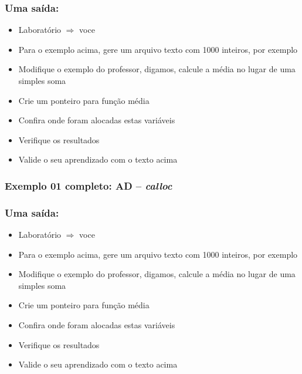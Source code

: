 \begin{frame}[fragile, c]

\frametitle{Uma saída:}
\begin{block}{}
\begin{itemize}
  \item Laboratório $\Rightarrow $ voce
  \item Para o exemplo acima, gere um arquivo texto com 1000 inteiros, por exemplo
  \item Modifique o exemplo do professor, digamos, calcule
  a média no lugar de uma simples soma
  \item Crie um ponteiro para  função média 
    \item Confira onde foram alocadas estas variáveis
  \item Verifique os resultados
  \item Valide o seu aprendizado com o texto acima 

\end{itemize}
\end{block}
\end{frame}


\begin{frame}[allowframebreaks=0.9, c]

\frametitle{Exemplo 01 completo: AD -- \textit{calloc}}


\pause

\end{frame}

\begin{frame}[fragile, c]

\frametitle{Uma saída:}
\begin{block}{}
\begin{itemize}
  \item Laboratório $\Rightarrow $ voce
  \item Para o exemplo acima, gere um arquivo texto com 1000 inteiros, por exemplo
  \item Modifique o exemplo do professor, digamos, calcule
  a média no lugar de uma simples soma
  \item Crie um ponteiro para  função média 
    \item Confira onde foram alocadas estas variáveis
  \item Verifique os resultados
  \item Valide o seu aprendizado com o texto acima 

\end{itemize}
\end{block}
\end{frame}


